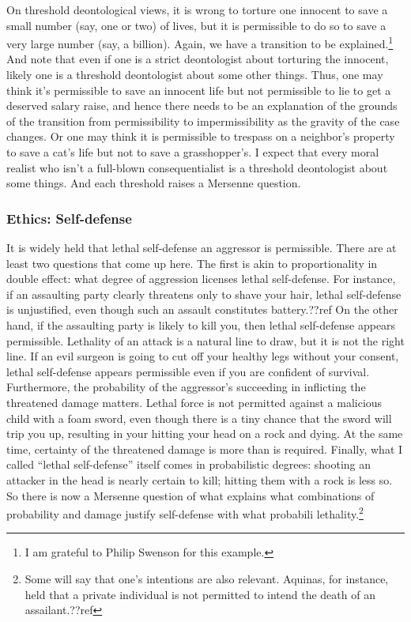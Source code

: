 On threshold deontological views, it is wrong to torture one innocent to save a small number (say, one or two) of lives,
but it is permissible to do so to save a very large number (say, a billion). Again, we have a transition to be 
explained.\footnote{I am grateful to Philip Swenson for this example.} And note that even if one is a strict deontologist
about torturing the innocent, likely one is a threshold deontologist about some other things. Thus, one may think it's
permissible to save an innocent life but not permissible to lie to get a deserved salary raise,
and hence there needs to be an explanation of the grounds of the transition from permissibility to impermissibility
as the gravity of the case changes. Or
one may think it is permissible to trespass on a neighbor's property to save a cat's life but not to save a grasshopper's.
I expect that every moral realist who isn't a full-blown consequentialist is a threshold deontologist about some things.
And each threshold raises a Mersenne question.

\subsubsection{Ethics: Self-defense}
It is widely held that lethal self-defense an aggressor is permissible. There are at least two questions that come up here.
The first is akin to proportionality in double effect: what degree of aggression licenses lethal self-defense. For instance, if an assaulting party clearly threatens only to shave your 
hair, lethal self-defense is unjustified, even though such an assault constitutes battery.??ref On the other hand, 
if the assaulting party is likely to kill you, then lethal self-defense appears permissible. 
Lethality of an attack is a natural line to draw, but it is not the right line. If an evil surgeon is going to 
cut off your healthy legs without your consent, lethal self-defense appears permissible even if 
you are confident of survival. Furthermore, the probability of the aggressor's succeeding in inflicting the 
threatened damage matters. Lethal force is not permitted against a malicious child with a foam sword, even though 
there is a tiny chance that the sword will trip you up, resulting in your hitting your head on a rock and dying. 
At the same time, certainty of the threatened damage is more than is required. Finally, what I called 
``lethal self-defense'' itself comes in probabilistic degrees: shooting an attacker in the head is nearly
certain to kill; hitting them with a rock is less so. So there is now a Mersenne question of 
what explains what combinations of probability and damage justify self-defense with what 
probabili lethality.\footnote{Some will say that one's intentions are also
relevant.  Aquinas, for instance, held that a private individual is not permitted to intend the death of 
an assailant.??ref}

